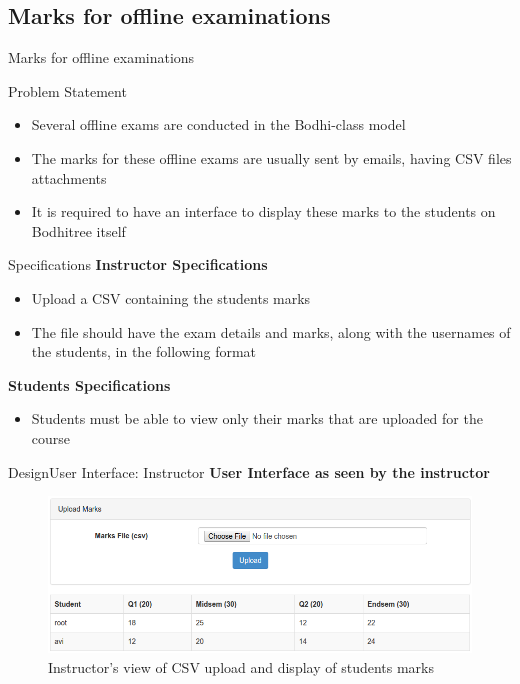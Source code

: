 \documentclass{beamer}
\begin{document}
\subsection{Marks for offline examinations}

\begin{frame}{Marks for offline examinations}
	\begin{block}{Problem Statement}
		\begin{itemize}
			\item Several offline exams are conducted in the Bodhi-class model
			\item The marks for these offline exams are usually sent by emails, having CSV files attachments
			\item It is required to have an interface to display these marks to the students on Bodhitree itself
		\end{itemize}
	\end{block}
\end{frame}

\begin{frame}{Specifications}
	\textbf{Instructor Specifications}
	\begin{itemize}
		\item Upload a CSV containing the students marks
		\item The file should have the exam details and marks, along with the usernames of the students, in the following format
	\end{itemize}

	\textbf{Students Specifications}
	\begin{itemize}
		\item Students must be able to view only their marks that are uploaded for the course
	\end{itemize}
	
\end{frame}

\begin{frame}{Design}{User Interface: Instructor}
	\textbf{User Interface as seen by the instructor}
	\begin{figure}
		\centering
		\includegraphics[width=0.8\linewidth]{media/marksi}
		\caption{Instructor's view of CSV upload and display of students marks}
		\label{fig:marksi}
	\end{figure}
\end{frame}
\end{document}
